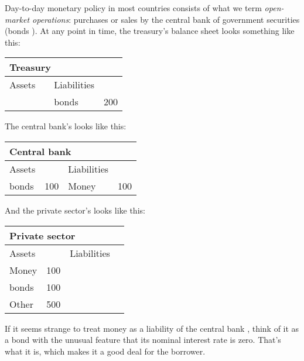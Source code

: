 Day-to-day monetary policy in most countries consists of what we term
{\it open-market operations\/}:
purchases or sales by the central bank  of government securities (bonds ).
At any point in time, the treasury's balance sheet  
 looks something like this:
%
\begin{center}
\begin{tabular}{lr|lr}
\multicolumn{4}{l}{Treasury} \\
\hline
Assets\phantom{ities} & \phantom{100}&  Liabilities \\
\hline
\phantom{bonds} & \phantom{200} & bonds \index{bond} & 200
\end{tabular}
\end{center}
%
The central bank's  looks like this:
%
\begin{center}
\begin{tabular}{lr|lr}
\multicolumn{4}{l}{Central bank \index{central bank}} \\
\hline
Assets\phantom{ities} &\phantom{100}&  Liabilities \\
\hline
bonds \index{bond} &  100 & Money & 100
\end{tabular}
\end{center}
%
And the private sector's looks like this:
%
\begin{center}
\begin{tabular}{lr|lr}
\multicolumn{4}{l}{Private sector} \\
\hline
Assets\phantom{ities}  &&  Liabilities \\
\hline
Money &  100  &  \phantom{Money} & \phantom{100} \\
bonds \index{bond} &  100  \\
Other &  500
\end{tabular}
\end{center}
%
If it seems strange to treat money as a liability of the
central bank , think of it as a bond  with the unusual
feature that its nominal interest rate is zero.
That's what it is, which makes it a good deal for the borrower.


